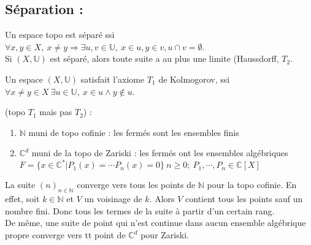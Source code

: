\subsection{ Séparation :}
\begin{definition}
Un espace topo est séparé ssi $\forall x,y\in X,\ x\neq y\Rightarrow \exists u,v\in \mathbb{U},\ x\in u, y\in v, u\cap v=\emptyset $.\\
Si $(X,\mathbb{U})$ est séparé, alors toute suite a au plus une limite (Haussdorff, $T_2$.\\

\end{definition}
\begin{definition}
	Un espace $(X,\mathbb{U})$ satisfait l'axiome $T_1$ de Kolmogorov, ssi $\forall x\neq y\in X\ \exists u\in \mathbb{U},\ x\in u \wedge y \not \in u$.\\

\end{definition}
\begin{ex}
 (topo $T_1$ mais pas $T_2$) :
\begin{enumerate}
	
   \item $\mathbb{N} $ muni de topo cofinie : les fermés sont les ensembles finis
\item $\mathbb{C}^d$ muni de la topo de Zariski : les fermés ont les ensembles algébriques $F=\{x\in \mathbb{C}^*|P_1(x)=\cdots P_n(x)=0\}\ n\ge 0;\ P_1,\cdots,P_n\in \mathbb{C}[X]$
\end{enumerate}
\end{ex} 
\begin{ex}
	
La suite $(n)_{n\in \mathbb{N} }$ converge vers tous les points de $\mathbb{N} $ pour la topo cofinie. En effet, soit $k\in \mathbb{N} $ et $V$ un voisinage de $k$. Alors $V$ contient tous les points sauf un nombre fini. Donc tous les termes de la suite à partir d'un certain rang.\\
De même, une suite de point qui n'est continue dans aucun ensemble algébrique propre converge vers tt point de $\mathbb{C}^d$ pour Zariski.
\end{ex}

